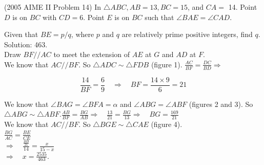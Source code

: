 \documentclass{article}
\begin{document}
(2005 AIME II Problem 14) In \(\triangle A B C, A B=13, B C=15\), and \(C A=\) 14. Point \(D\) is on \(B C\) with \(C D=6\). Point \(E\) is on \(B C\) such that \(\angle B A E=\angle C A D\).

Given that \(B E=p / q\), where \(p\) and \(q\) are relatively prime positive integers, find \(q\).\\
Solution: 463.\\
Draw \(B F / / A C\) to meet the extension of \(A E\) at \(G\) and \(A D\) at \(F\).\\
We know that \(A C / / B F\). So \(\triangle A D C \sim \triangle F D B\) (figure 1). \(\frac{A C}{B F}=\frac{D C}{B D} \Rightarrow\)

\[
\frac{14}{B F}=\frac{6}{9} \quad \Rightarrow \quad B F=\frac{14 \times 9}{6}=21
\]

We know that \(\angle B A G=\angle B F A=\alpha\) and \(\angle A B G=\angle A B F\) (figures 2 and 3). So \(\triangle A B G \sim \triangle A B F . \frac{A B}{B F}=\frac{B G}{A B} \Rightarrow \quad \frac{13}{21}=\frac{B G}{13} \Rightarrow \quad B G=\frac{169}{21}\)\\
We know that \(A C / / B F\). So \(\triangle B G E \sim \triangle C A E\) (figure 4).\\
\(\frac{B G}{A C}=\frac{B E}{C E}\)\\
\(\Rightarrow \quad \frac{\frac{169}{21}}{14}=\frac{x}{15-x}\)\\
\(\Rightarrow \quad x=\frac{2535}{463}\).
\end{document}
